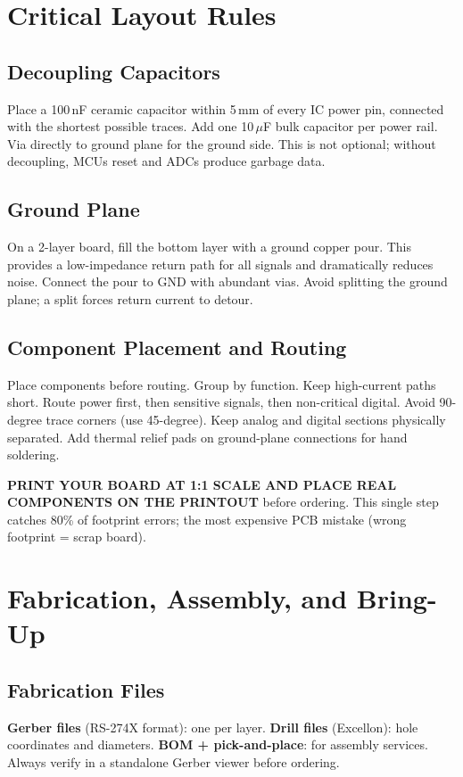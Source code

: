\section{Critical Layout Rules}

\subsection{Decoupling Capacitors}
Place a 100\,nF ceramic capacitor within 5\,mm of every IC power pin, connected with the shortest possible traces. Add one 10\,$\mu$F bulk capacitor per power rail. Via directly to ground plane for the ground side. This is not optional; without decoupling, MCUs reset and ADCs produce garbage data.

\subsection{Ground Plane}
On a 2-layer board, fill the bottom layer with a ground copper pour. This provides a low-impedance return path for all signals and dramatically reduces noise. Connect the pour to GND with abundant vias. Avoid splitting the ground plane; a split forces return current to detour.

\subsection{Component Placement and Routing}
Place components before routing. Group by function. Keep high-current paths short. Route power first, then sensitive signals, then non-critical digital. Avoid 90-degree trace corners (use 45-degree). Keep analog and digital sections physically separated. Add thermal relief pads on ground-plane connections for hand soldering.

\begin{tipbox}
\textbf{PRINT YOUR BOARD AT 1:1 SCALE AND PLACE REAL COMPONENTS ON THE PRINTOUT} before ordering. This single step catches 80\% of footprint errors; the most expensive PCB mistake (wrong footprint = scrap board).
\end{tipbox}

\section{Fabrication, Assembly, and Bring-Up}

\subsection{Fabrication Files}
\textbf{Gerber files} (RS-274X format): one per layer. \textbf{Drill files} (Excellon): hole coordinates and diameters. \textbf{BOM + pick-and-place}: for assembly services. Always verify in a standalone Gerber viewer before ordering.

